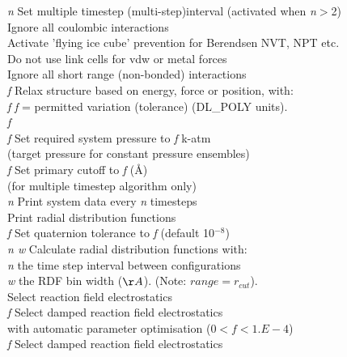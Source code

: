 \begin{tabbing}
 {\em n} \> Set multiple timestep (multi-step)interval 
(activated when {\em n}$>$2)\\
 \> Ignore all coulombic interactions\\
 \> Activate 'flying ice cube' prevention for Berendsen NVT, NPT etc.\\ 
 \> Do not use link cells for vdw or metal forces\\
 \> Ignore all short range (non-bonded) interactions\\
 {\em f} \> Relax structure based on energy, force or
position, with: \\
 {\em f} \> {\em f} = permitted variation (tolerance)
(DL\_POLY units).\\
 {\em f} \> \\
 {\em f} \> Set required system pressure to {\em f} k-atm
\\
\> \> (target pressure for constant pressure ensembles)\\
  {\em f}\> Set primary cutoff to {\em f} (\AA) \\
\> \> (for multiple timestep algorithm only)\\
 {\em n} \> Print system data every {\em n} timesteps \\
 \> Print radial distribution functions \\
 {\em f} \> Set quaternion tolerance to  {\em f}
 (default 10$^{-8}$)\\
 {\em n w}\> Calculate radial distribution functions with:\\
\> \> {\em n} the time step interval between configurations \\
\> \> {\em w} the RDF bin width ($\AA$). (Note: $range=r_{cut}$).\\
 \> Select reaction field electrostatics\\
 {\em f}\> Select damped reaction field
 electrostatics \\
\> \> with automatic parameter optimisation ($0<f<1.E-4$) \\
 {\em f}\> Select damped reaction field
electrostatics \\

\end{tabbing}
